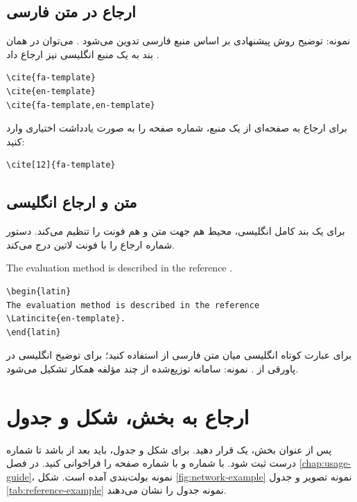 \subsection{ارجاع در متن فارسی}
نمونه: توضیح روش پیشنهادی بر اساس منبع فارسی تدوین می‌شود \cite{fa-template}. می‌توان در همان بند به یک منبع انگلیسی نیز ارجاع داد \cite{en-template}.
\begin{latin}
\begin{lstlisting}[style=DSCCode]
\cite{fa-template}
\cite{en-template}
\cite{fa-template,en-template}
\end{lstlisting}
\end{latin}
برای ارجاع به صفحه‌ای از یک منبع، شماره صفحه را به صورت یادداشت اختیاری وارد کنید:
\begin{latin}
\begin{lstlisting}[style=DSCCode]
\cite[12]{fa-template}
\end{lstlisting}
\end{latin}

\subsection{متن و ارجاع انگلیسی}
برای یک بند کامل انگلیسی، محیط  هم جهت متن و هم فونت را تنظیم می‌کند. دستور  شماره ارجاع را با فونت لاتین درج می‌کند.
\begin{latin}
The evaluation method is described in the reference .
\begin{lstlisting}[style=DSCCode]
\begin{latin}
The evaluation method is described in the reference
\Latincite{en-template}.
\end{latin}
\end{lstlisting}
\end{latin}
برای عبارت کوتاه انگلیسی میان متن فارسی از  استفاده کنید؛ برای توضیح انگلیسی در پاورقی از .
نمونه: سامانه توزیع‌شده از چند مؤلفه همکار تشکیل می‌شود.

\section{ارجاع به بخش، شکل و جدول}
پس از عنوان بخش، یک  قرار دهید. برای شکل و جدول،  باید بعد از  باشد تا شماره درست ثبت شود. با  شماره و با  شماره صفحه را فراخوانی کنید.
در فصل \ref{chap:usage-guide}، نمونه بولت‌بندی آمده است. شکل \ref{fig:network-example} نمونه تصویر و جدول \ref{tab:reference-example} نمونه جدول را نشان می‌دهند.

